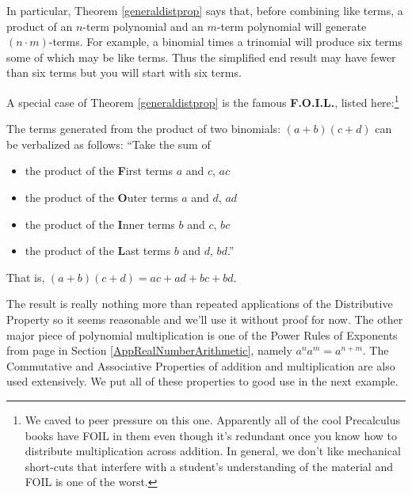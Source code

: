 \medskip

In particular, Theorem \ref{generaldistprop} says that, before combining like terms, a product of an $n$-term polynomial and an $m$-term polynomial will generate $(n \cdot m)$-terms.  For example, a binomial times a trinomial will produce six terms some of which may be like terms.  Thus the simplified end result may have fewer than six terms but you will start with six terms. 

\medskip

A special case of Theorem \ref{generaldistprop}  is the famous \textbf{F.O.I.L.}, listed here:\footnote{We caved to peer pressure on this one.  Apparently all of the cool Precalculus books have FOIL in them even though it's redundant once you know how to distribute multiplication across addition.  In general, we don't like mechanical short-cuts that interfere with a student's understanding of the material and FOIL is one of the worst.}

\medskip

\colorbox{ResultColor}{\bbm

\begin{thm}[F.O.I.L.]\label{FOIL} 
The terms generated from the product of two binomials: $(a + b)(c+d)$ can be verbalized as follows: ``Take the sum of

\begin{itemize}

\item the product of the \textbf{F}irst terms $a$ and $c$, $ac$

\item the product of the \textbf{O}uter terms $a$ and $d$, $ad$

\item  the product of the \textbf{I}nner terms $b$ and $c$, $bc$

\item  the product of the \textbf{L}ast terms $b$ and $d$, $bd$.''

\end{itemize}

That is, $(a+b)(c+d) = ac + ad + bc + bd$.

\end{thm}

\ebm}

\medskip

The result is really nothing more than repeated applications of the Distributive Property so it seems reasonable and we'll use it without proof for now.  The other major piece of polynomial multiplication is one of the Power Rules of Exponents from page \pageref{propertiesofintegerexponents} in Section \ref{AppRealNumberArithmetic}, namely  $a^n a^m = a^{n+m}$.  The Commutative and Associative Properties of addition and multiplication are also used extensively.  We put all of these properties to good use in the next example.


